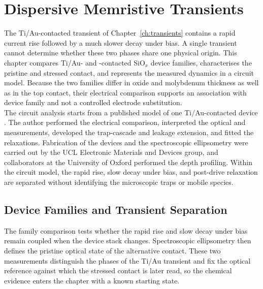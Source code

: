 \chapter{Dispersive Memristive Transients}\label{ch:model}

\noindent The Ti/Au-contacted transient of Chapter~\ref{ch:transients} contains a rapid current rise followed by a
much slower decay under bias. A single transient cannot determine whether these two phases share one physical
origin. This chapter compares Ti/Au- and -contacted SiO$_x$ device families,
characterises the pristine and stressed  contact, and represents the measured dynamics in a circuit
model. Because the two families differ in oxide and molybdenum thickness as well as in the top contact, their
electrical comparison supports an association with device family and not a controlled electrode substitution.\\

\noindent The circuit analysis starts from a published  model of one Ti/Au-contacted device
\cite{mannion2023compact}. The author performed the electrical comparison, interpreted the optical and
 measurements, developed the trap-cascade and leakage extension, and
fitted the  relaxations. Fabrication of the  devices and the spectroscopic ellipsometry
were carried out by the UCL Electronic Materials and Devices group, and collaborators at the University of Oxford
performed the  depth profiling. Within the circuit model, the rapid rise, slow decay under bias, and
post-drive relaxation are separated without identifying the microscopic traps or mobile species.

\section[Device Families and Transient Separation]{Device Families and Transient Separation}\label{sec:5p1}

\noindent The family comparison tests whether the rapid rise and slow decay under bias remain coupled when the
device stack changes. Spectroscopic ellipsometry then defines the pristine optical state of the alternative
 contact. These two measurements distinguish the phases of the Ti/Au transient and fix the optical
reference against which the stressed contact is later read, so the chemical evidence enters the chapter with a
known starting state.

